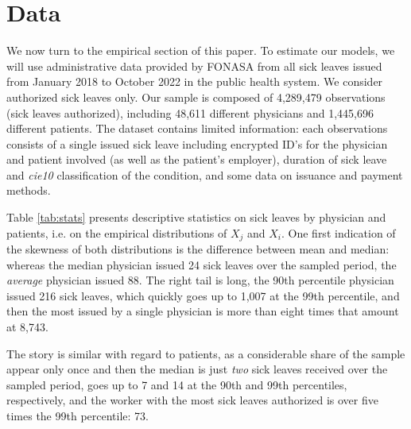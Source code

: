 \documentclass[../main.tex]{subfiles}
\begin{document}
\section{Data}

We now turn to the empirical section of this paper. To estimate our models, we will use administrative data provided by FONASA from all sick leaves issued from January 2018 to October 2022 in the public health system. We consider authorized sick leaves only. Our sample is composed of 4,289,479 observations (sick leaves authorized), including 48,611 different physicians and 1,445,696 different patients. The dataset contains limited information: each observations consists of a single issued sick leave including encrypted ID's for the physician and patient involved (as well as the patient's employer), duration of sick leave and \textit{cie10} classification of the condition, and some data on issuance and payment methods.

Table \ref{tab:stats} presents descriptive statistics on sick leaves by physician and patients, i.e. on the empirical distributions of $X_j$ and $X_i$. One first indication of the skewness of both distributions is the difference between mean and median: whereas the median physician issued 24 sick leaves over the sampled period, the \textit{average} physician issued 88. The right tail is long, the 90th percentile physician issued 216 sick leaves, which quickly goes up to 1,007 at the 99th percentile, and then the most issued by a single physician is more than eight times that amount at 8,743.

The story is similar with regard to patients, as a considerable share of the sample appear only once and then the median is just \textit{two} sick leaves received over the sampled period, goes up to 7 and 14 at the 90th and 99th percentiles, respectively, and the worker with the most sick leaves authorized is over five times the 99th percentile: 73.
\end{document}
